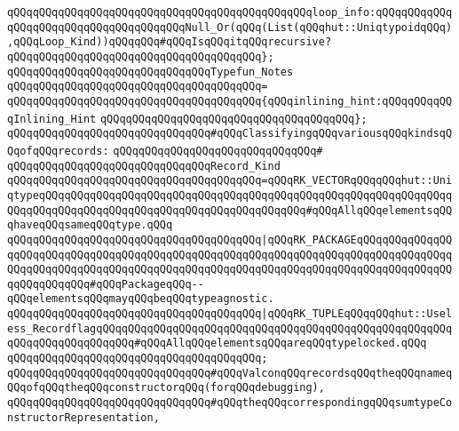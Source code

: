 \verb|qQQqqQQqqQQqqQQqqQQqqQQqqQQqqQQqqQQqqQQqqQQqqQQqloop_info:qQQqqQQqqQQqqQQqqQQqqQQqqQQqqQQqqQQqqQQqNull_Or(qQQq(List(qQQqhut::UniqtypoidqQQq),qQQqLoop_Kind))qQQqqQQq#qQQqIsqQQqitqQQqrecursive?|\newline
\verb|qQQqqQQqqQQqqQQqqQQqqQQqqQQqqQQqqQQqqQQq};|\newline
\newline
\verb|qQQqqQQqqQQqqQQqqQQqqQQqqQQqqQQqTypefun_Notes|\newline
\verb|qQQqqQQqqQQqqQQqqQQqqQQqqQQqqQQqqQQqqQQq=|\newline
\verb|qQQqqQQqqQQqqQQqqQQqqQQqqQQqqQQqqQQqqQQq{qQQqinlining_hint:qQQqqQQqqQQqInlining_Hint|\newline
\verb|qQQqqQQqqQQqqQQqqQQqqQQqqQQqqQQqqQQqqQQq};|\newline
\newline
\verb|qQQqqQQqqQQqqQQqqQQqqQQqqQQqqQQq#qQQqClassifyingqQQqvariousqQQqkindsqQQqofqQQqrecords:|\newline
\verb|qQQqqQQqqQQqqQQqqQQqqQQqqQQqqQQq#|\newline
\verb|qQQqqQQqqQQqqQQqqQQqqQQqqQQqqQQqRecord_Kind|\newline
\verb|qQQqqQQqqQQqqQQqqQQqqQQqqQQqqQQqqQQqqQQq=qQQqRK_VECTORqQQqqQQqhut::UniqtypeqQQqqQQqqQQqqQQqqQQqqQQqqQQqqQQqqQQqqQQqqQQqqQQqqQQqqQQqqQQqqQQqqQQqqQQqqQQqqQQqqQQqqQQqqQQqqQQqqQQqqQQqqQQqqQQq#qQQqAllqQQqelementsqQQqhaveqQQqsameqQQqtype.qQQq|\newline
\verb|qQQqqQQqqQQqqQQqqQQqqQQqqQQqqQQqqQQqqQQq|\verb#|qQQqRK_PACKAGEqQQqqQQqqQQqqQQqqQQqqQQqqQQqqQQqqQQqqQQqqQQqqQQqqQQqqQQqqQQqqQQqqQQqqQQqqQQqqQQqqQQqqQQqqQQqqQQqqQQqqQQqqQQqqQQqqQQqqQQqqQQqqQQqqQQqqQQqqQQqqQQqqQQqqQQqqQQqqQQqqQQqqQQq#\verb|#qQQqPackageqQQq--qQQqelementsqQQqmayqQQqbeqQQqtypeagnostic.|\newline
\verb|qQQqqQQqqQQqqQQqqQQqqQQqqQQqqQQqqQQqqQQq|\verb#|qQQqRK_TUPLEqQQqqQQqhut::Useless_RecordflagqQQqqQQqqQQqqQQqqQQqqQQqqQQqqQQqqQQqqQQqqQQqqQQqqQQqqQQqqQQqqQQqqQQqqQQqqQQq#\verb|#qQQqAllqQQqelementsqQQqareqQQqtypelocked.qQQq|\newline
\verb|qQQqqQQqqQQqqQQqqQQqqQQqqQQqqQQqqQQqqQQq;|\newline
\newline
\newline
\verb|qQQqqQQqqQQqqQQqqQQqqQQqqQQqqQQq#qQQqValconqQQqrecordsqQQqtheqQQqnameqQQqofqQQqtheqQQqconstructorqQQq(forqQQqdebugging),|\newline
\verb|qQQqqQQqqQQqqQQqqQQqqQQqqQQqqQQq#qQQqtheqQQqcorrespondingqQQqsumtypeConstructorRepresentation,|\newline
